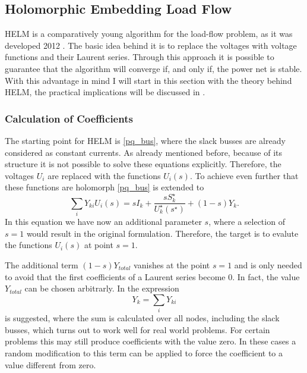 \subsection{Holomorphic Embedding Load Flow}
\label{sec:helm}

HELM is a comparatively young algorithm for the load-flow problem, as it was developed 2012 \citep{helmIEEE}. The basic idea behind it is to replace the voltages with voltage functions and their Laurent series. Through this approach it is possible to guarantee that the algorithm will converge if, and only if, the power net is stable. With this advantage in mind I will start in this section with the theory behind HELM, the practical implications will be discussed in .

\subsubsection{Calculation of Coefficients}

The starting point for HELM is \eqref{pq_bus}, where the slack busses are already considered as constant currents. As already mentioned before, because of its structure it is not possible to solve these equations explicitly. Therefore, the voltages $U_i$ are replaced with the functions $U_i(s)$. To achieve even further that these functions are holomorph \citep{helmPatentSept2009} \eqref{pq_bus} is extended to
\begin{equation}	
		\sum_i Y_{ki} U_{i}(s) = s I_k + \frac{s S_k^\star}{U_k^\star(s^\star)} + (1 - s) Y_k.
		\label{eq:pq_bus_embedded}
\end{equation}
In this equation we have now an additional parameter $s$, where a selection of $s = 1$ would result in the original formulation. Therefore, the target is to evalute the functions $U_i(s)$ at point $s = 1$.

The additional term $(1 - s) Y_{total}$ vanishes at the point $s = 1$ and is only needed to avoid that the first coefficients of a Laurent series become 0. In fact, the value $Y_{total}$ can be chosen arbitrarly. In \citep{helmPatentSept2009} the expression
\begin{equation}
	Y_k = \sum_i Y_{ki}
\end{equation}
is suggested, where the sum is calculated over all nodes, including the slack busses, which turns out to work well for real world problems. For certain problems this may still produce coefficients with the value zero. In these cases a random modification to this term can be applied to force the coefficient to a value different from zero.

